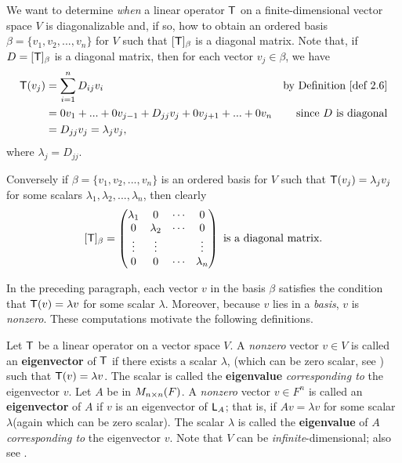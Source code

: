 \begin{remark} \label{remark 5.1.2}
We want to determine \emph{when} a linear operator \(\textsf{T}\) on a finite-dimensional vector space \(V\) is diagonalizable and,
if so, how to obtain an ordered basis \(\beta = \{ v_1, v_2, ..., v_n \}\) for \(V\) such that \([\textsf{T}]_{\beta}\) is a diagonal matrix.
Note that, if \(D = [\textsf{T}]_{\beta}\) is a diagonal matrix, then for each vector \(v_j \in \beta\), we have
\begin{align*}
    \T(v_j) & = \sum_{i = 1}^n D_{ij} v_i & \text{by \DEF{2.6}} \\
            & = 0 v_1 + ... + 0 v_{j - 1} + D_{jj} v_j + 0 v_{j + 1} + ... + 0 v_n & \text{since \(D\) is diagonal} \\
            & = D_{jj} v_j = \lambda_j v_j,
\end{align*}
where \(\lambda_j = D_{jj}\).

Conversely if \(\beta = \{ v_1, v_2, ..., v_n \}\) is an ordered basis for \(V\) such that \(\textsf{T}(v_j) = \lambda_j v_j\) for some scalars \(\lambda_1, \lambda_2, ..., \lambda_n\), then clearly
\[
    [\textsf{T}]_{\beta} = \begin{pmatrix}
        \lambda_{1} & 0 & \cdots & 0 \\
        0 & \lambda_{2} & \cdots & 0 \\
        \vdots & \vdots & & \vdots \\
        0 & 0 & \cdots & \lambda_{n}
    \end{pmatrix} \text{ is a diagonal matrix.}
\]
\end{remark}

In the preceding paragraph, each vector \(v\) in the basis \(\beta\) satisfies the condition that \(\textsf{T}(v) = \lambda v\) for some scalar \(\lambda\).
Moreover, because \(v\) lies in a \emph{basis}, \(v\) is \emph{nonzero}.
These computations motivate the following definitions.

\begin{definition} \label{def 5.2}
Let \(\textsf{T}\) be a linear operator on a vector space \(V\).
A \emph{nonzero} vector \(v \in V\) is called an \textbf{eigenvector} of \(\textsf{T}\) if there exists a scalar \(\lambda\), (which can be zero scalar, see ) such that \(\textsf{T}(v) = \lambda v\).
The scalar is called the \textbf{eigenvalue} \emph{corresponding to} the eigenvector \(v\).
Let \(A\) be in \(M_{n \times n}(F)\).
A \emph{nonzero} vector \(v \in F^n\) is called an \textbf{eigenvector} of \(A\) if \(v\) is an eigenvector of \(\textsf{L}_A\);
that is, if \(Av = \lambda v\) for some scalar \(\lambda\)(again which can be zero scalar).
The scalar \(\lambda\) is called the \textbf{eigenvalue} of \(A\) \emph{corresponding to} the eigenvector \(v\).
Note that \(V\) can be \emph{infinite}-dimensional;
also see .
\end{definition}

